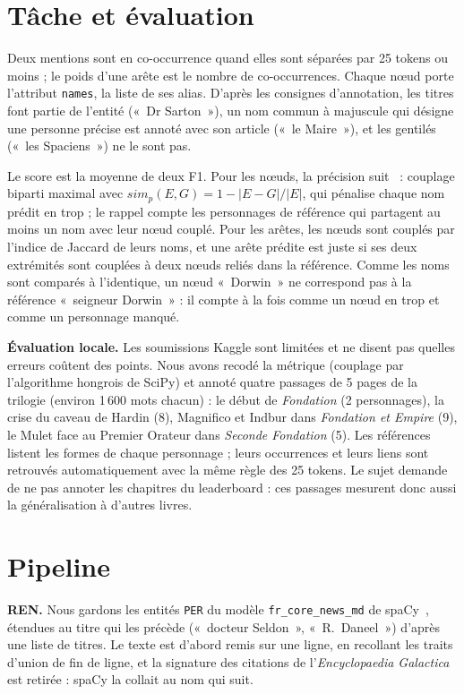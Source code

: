 \documentclass[cameraready]{Interspeech}
\begin{document}
\section{Tâche et évaluation}

Deux mentions sont en co-occurrence quand elles sont séparées par 25 tokens ou moins ; le poids d'une arête est
le nombre de co-occurrences. Chaque nœud porte l'attribut \texttt{names}, la liste de ses alias. D'après les
consignes d'annotation, les titres font partie de l'entité («~Dr Sarton~»), un nom commun à majuscule qui désigne
une personne précise est annoté avec son article («~le Maire~»), et les gentilés («~les Spaciens~») ne le sont pas.

Le score est la moyenne de deux F1. Pour les nœuds, la précision suit~\cite{vala2015} : couplage biparti maximal
avec $sim_p(E,G)=1-|E-G|/|E|$, qui pénalise chaque nom prédit en trop ; le rappel compte les personnages de
référence qui partagent au moins un nom avec leur nœud couplé. Pour les arêtes, les nœuds sont couplés par
l'indice de Jaccard de leurs noms, et une arête prédite est juste si ses deux extrémités sont couplées à deux
nœuds reliés dans la référence. Comme les noms sont comparés à l'identique, un nœud «~Dorwin~» ne correspond pas
à la référence «~seigneur Dorwin~» : il compte à la fois comme un nœud en trop et comme un personnage manqué.

\textbf{Évaluation locale.} Les soumissions Kaggle sont limitées et ne disent pas quelles erreurs coûtent des
points. Nous avons recodé la métrique (couplage par l'algorithme hongrois de SciPy) et annoté quatre passages de
5 pages de la trilogie (environ 1\,600 mots chacun) : le début de \emph{Fondation} (2 personnages), la crise du
caveau de Hardin (8), Magnifico et Indbur dans \emph{Fondation et Empire} (9), le Mulet face au Premier Orateur
dans \emph{Seconde Fondation} (5). Les références listent les formes de chaque personnage ; leurs occurrences et
leurs liens sont retrouvés automatiquement avec la même règle des 25 tokens. Le sujet demande de ne pas annoter
les chapitres du leaderboard : ces passages mesurent donc aussi la généralisation à d'autres livres.

\section{Pipeline}

\textbf{REN.} Nous gardons les entités \texttt{PER} du modèle \texttt{fr\_core\_news\_md} de
spaCy~\cite{spacy}, étendues au titre qui les précède («~docteur Seldon~», «~R.~Daneel~») d'après une liste de
titres. Le texte est d'abord remis sur une ligne, en recollant les traits d'union de fin de ligne, et la
signature des citations de l'\emph{Encyclopaedia Galactica} est retirée : spaCy la collait au nom qui suit.
\end{document}
